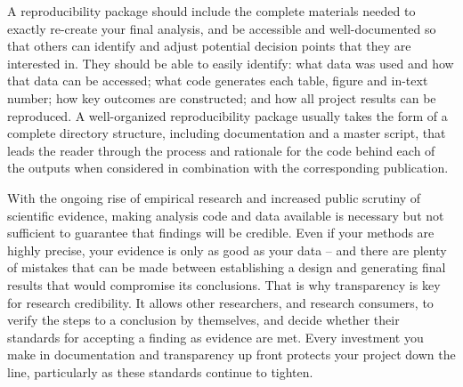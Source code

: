 A reproducibility package should include the complete materials needed
to exactly re-create your final analysis,
and be accessible and well-documented so that others can identify
and adjust potential decision points that they are interested in.
They should be able to easily identify:
what data was used and how that data can be accessed;
what code generates each table, figure and in-text number;
how key outcomes are constructed;
and how all project results can be reproduced.
A well-organized reproducibility package usually takes the form
of a complete directory structure, including documentation and a master script,
that leads the reader through the process and rationale
for the code behind each of the outputs
when considered in combination with the corresponding publication.

\bigskip
With the ongoing rise of empirical research and increased public scrutiny of scientific evidence,
making analysis code and data available
is necessary but not sufficient to guarantee that findings will be credible.
Even if your methods are highly precise,
your evidence is only as good as your data --
and there are plenty of mistakes that can be made between
establishing a design and generating final results that would compromise its conclusions.
That is why transparency is key for research credibility.
It allows other researchers, and research consumers,
to verify the steps to a conclusion by themselves,
and decide whether their standards for accepting a finding as evidence are met.
Every investment you make in documentation and transparency up front
protects your project down the line, particularly as these standards continue to tighten.
